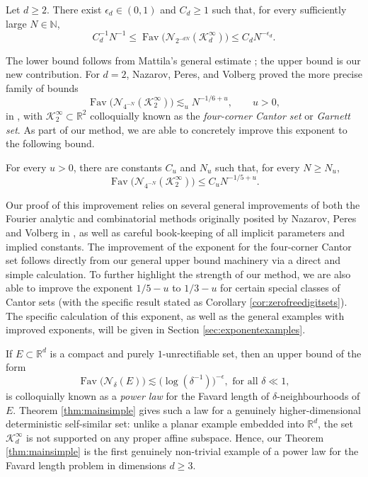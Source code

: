 \documentclass[12pt]{amsart}
\numberwithin{equation}{section}
\DeclareMathOperator{\Fav}{Fav}
\begin{document}
\begin{theorem}\label{thm:mainsimple}
Let $d\geq2$.  There exist $\epsilon_d\in(0,1)$ and $C_d\geq1$ such that, for every sufficiently large $N \in \mathbb{N}$,
\begin{equation}\label{eq:thmmainsimple}
C_d^{-1}N^{-1}
\leq
\Fav\big(\mathcal{N}_{2^{-dN}}(\mathcal{K}_d^\infty)\big)
\leq
C_dN^{-\epsilon_d}.
\end{equation}
\end{theorem}

The lower bound follows from Mattila's general estimate \cite[Theorem 4.1]{Mattila}; the upper bound is our new contribution.  For $d=2$, Nazarov, Peres, and Volberg proved the more precise family of bounds
\[
\Fav\big(\mathcal{N}_{4^{-N}}(\mathcal{K}_2^\infty)\big)\lesssim_u N^{-1/6+u},
\qquad u>0,
\]
in \cite{NPV}, with $\mathcal{K}_2^{\infty} \subset \mathbb{R}^2$ colloquially known as the \textit{four-corner Cantor set} or \textit{Garnett set}. As part of our method, we are able to concretely improve this exponent to the following bound.

\begin{theorem}
For every $u>0$, there are constants $C_u$ and $N_u$ such that, for every $N\geq N_u$,
\[
\Fav\big(\mathcal{N}_{4^{-N}}(\mathcal{K}_2^\infty)\big)\leq C_uN^{-1/5+u}.
\]
\end{theorem}

Our proof of this improvement relies on several general improvements of both the Fourier analytic and combinatorial methods originally posited by Nazarov, Peres and Volberg in \cite{NPV}, as well as careful book-keeping of all implicit parameters and implied constants. The improvement of the exponent for the four-corner Cantor set follows directly from our general upper bound machinery via a direct and simple calculation. To further highlight the strength of our method, we are also able to improve the exponent $1/5 - u$ to $1/3 - u$ for certain special classes of Cantor sets (with the specific result stated as Corollary \ref{cor:zerofreedigitsets}). The specific calculation of this exponent, as well as the general examples with improved exponents, will be given in Section \ref{sec:exponentexamples}.

If $E \subset \mathbb{R}^d$ is a compact and purely $1$-unrectifiable set, then an upper bound of the form
$$
\Fav \big(\mathcal{N}_{\delta} (E)\big) \lesssim \bigl(\log(\delta^{-1})\bigr)^{-\epsilon}, \textrm{ for all } \delta \ll 1,
$$
is colloquially known as a \textit{power law} for the Favard length of $\delta$-neighbourhoods of $E$. Theorem \ref{thm:mainsimple} gives such a law for a genuinely higher-dimensional deterministic self-similar set: unlike a planar example embedded into $\mathbb{R}^d$, the set $\mathcal{K}_d^\infty$ is not supported on any proper affine subspace. Hence, our Theorem \ref{thm:mainsimple} is the first genuinely non-trivial example of a power law for the Favard length problem in dimensions $d \geq 3$.
\end{document}
